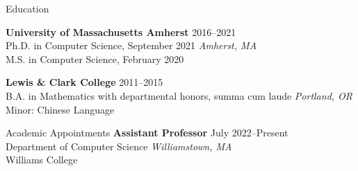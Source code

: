 \documentclass{resume} %
\begin{document}
%


\begin{rSection}{Education}

{\bf University of Massachusetts Amherst} \hfill {2016--2021} \\ 
Ph.D. in Computer Science, September 2021 \hfill {\em Amherst, MA} \\
M.S. in Computer Science, February 2020
 

{\bf Lewis \& Clark College} \hfill {2011--2015} \\ 
B.A. in Mathematics with departmental honors, summa cum laude \hfill {\em Portland, OR} \\
Minor: Chinese Language\\
\end{rSection}

\begin{rSection}{Academic Appointments}
{\bf Assistant Professor} \hfill {July 2022--Present} \\
Department of Computer Science \hfill {\em Williamstown, MA} \\ 
 Williams College
\end{rSection}

\end{document}

